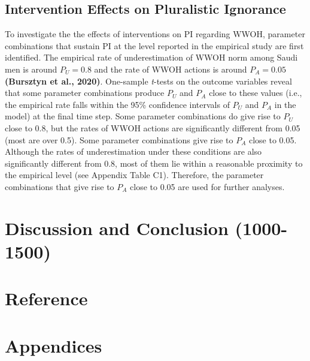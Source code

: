 \documentclass[
  11pt,
]{article}
\begin{document}
\hypertarget{intervention-effects-on-pluralistic-ignorance}{%
\subsection{Intervention Effects on Pluralistic
Ignorance}\label{intervention-effects-on-pluralistic-ignorance}}

To investigate the the effects of interventions on PI regarding WWOH,
parameter combinations that sustain PI at the level reported in the
empirical study are first identified. The empirical rate of
underestimation of WWOH norm among Saudi men is around \(P_U = 0.8\) and
the rate of WWOH actions is around \(P_A = 0.05\) \textbf{(Bursztyn et
al., 2020)}. One-sample \emph{t}-tests on the outcome variables reveal
that some parameter combinations produce \(P_U\) and \(P_A\) close to
these values (i.e., the empirical rate falls within the 95\% confidence
intervals of \(P_U\) and \(P_A\) in the model) at the final time step.
Some parameter combinations do give rise to \(P_U\) close to 0.8, but
the rates of WWOH actions are significantly different from 0.05 (most
are over 0.5). Some parameter combinations give rise to \(P_A\) close to
0.05. Although the rates of underestimation under these conditions are
also significantly different from 0.8, most of them lie within a
reasonable proximity to the empirical level (see Appendix Table C1).
Therefore, the parameter combinations that give rise to \(P_A\) close to
0.05 are used for further analyses.

\hypertarget{discussion-and-conclusion-1000-1500}{%
\section{Discussion and Conclusion
(1000-1500)}\label{discussion-and-conclusion-1000-1500}}

\newpage

\hypertarget{reference}{%
\section*{Reference}\label{reference}}

\newpage

\hypertarget{appendices}{%
\section*{Appendices}\label{appendices}}
\end{document}
